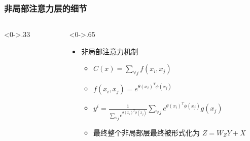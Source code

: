 \begin{frame}
	\frametitle{非局部注意力层的细节}
	\begin{columns}[T] %
		\begin{column}<0->{.33\textwidth}
			\begin{figure}[thpb]
				\centering
			\end{figure}
		\end{column}
		\hfill%
		\begin{column}<0->{.65\textwidth}
			\begin{itemize}
				\item<1-> 非局部注意力机制
				\begin{itemize}
					\item<1-> $ C\left(x\right)=\sum_{\forall j}f\left(x_i,x_j\right) $
					\item<1-> $ f\left(x_i,x_j\right)=e^{ \theta \left(x_i\right)^T \phi \left(x_j\right) } $
					\item <1-> $ y^i=\frac{1}{\sum_{\forall j} e^{\theta\left(x_i\right)^T \phi \left(x_j\right)}} \sum_{\forall j} e^{\theta\left(x_i\right)^T \phi \left(x_j\right)} g\left(x_j\right) $
					\item <1-> 最终整个非局部层最终被形式化为 $ Z=W_{Z}Y+X $
				\end{itemize}
				
			\end{itemize}
		\end{column}%
	\end{columns}
\end{frame}


